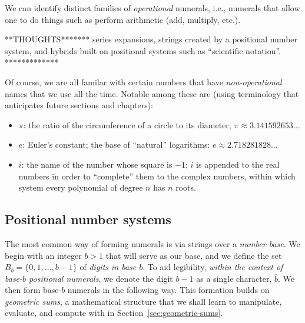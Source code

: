 We can identify distinct families of {\em operational}
numerals, i.e., numerals that allow one to
do things such as perform arithmetic (add, multiply, etc.).

**THOUGHTS*******
series expansions, strings created by a positional number system, and
hybrids built on positional systems such as ``scientific notation''.
*************


Of course, we are all familar with certain numbers that have {\em
  non-operational} names that we use all the time.  Notable among
these are (using terminology that anticipates future sections and
chapters):
\begin{itemize}
\item
$\pi$: the ratio of the circumference of a circle to its diameter;
  $\pi \approx 3.141592653 \ldots$
\item
$e$: Euler's constant; the base of ``natural'' logarithms: $e \approx
  2.718281828 \ldots$
\item
$i$: the name of the number whose square is $-1$; $i$ is appended to
  the real numbers in order to ``complete'' them to the complex
  numbers, within which system every polynomial of degree $n$ has $n$
  roots.
\end{itemize}

\medskip

\subsection{Positional number systems}

The most common way of forming numerals is via strings over a {\it
  number base}.  
%
We begin with an integer $b>1$ that will serve as our base, and we
define the set $B_b = \{ 0, 1, \ldots, b-1\}$ of {\it digits in base
  $b$}.
%
To aid legibility, {\em within the context of base-$b$ positional
  numerals}, we denote the digit $b-1$ as a single character,
$\bar{b}$.
%
We then form base-$b$ numerals in the following way.
%
This formation builds on {\em geometric sums}, a mathematical
structure that we shall learn to manipulate, evaluate, and compute
with in Section~\ref{sec:geometric-sums}.

